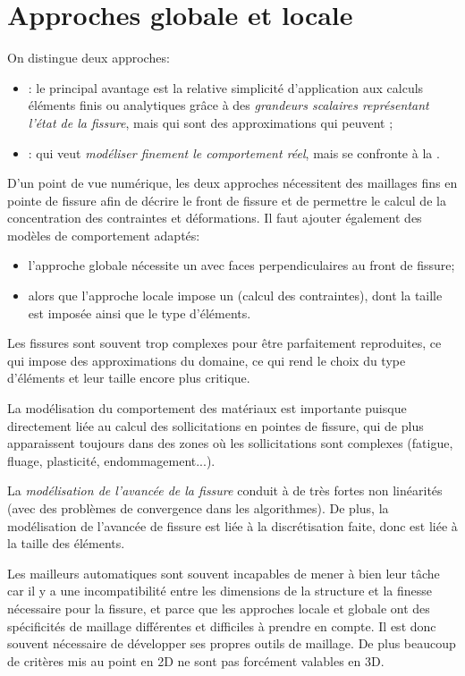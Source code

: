\medskip
\section{Approches globale et locale}
On distingue deux approches:
\begin{itemize}
  \item {}: le principal avantage est la relative simplicité d'application aux calculs éléments finis ou analytiques grâce à des \emph{grandeurs scalaires représentant l'état de la fissure}, mais qui sont des approximations qui peuvent ;
  \item {}: qui veut \emph{modéliser finement le comportement réel}, mais se confronte à la .
\end{itemize}
\medskipvm
D'un point de vue numérique, les deux approches nécessitent des maillages fins en pointe de fissure afin de décrire le front de fissure et de permettre le calcul de la concentration des contraintes et déformations. Il faut ajouter également des modèles de comportement adaptés:
\begin{itemize}
  \item l'approche globale nécessite un  avec faces perpendiculaires au front de fissure;
  \item alors que l'approche locale impose un  (calcul des contraintes), dont la taille est imposée ainsi que le type d'éléments.
\end{itemize}
\medskipvm
Les fissures sont souvent trop complexes pour être parfaitement reproduites, ce qui impose des approximations du domaine, ce qui rend le choix du type d'éléments et leur taille encore plus critique.

La modélisation du comportement des matériaux est importante puisque directement liée au calcul des sollicitations en pointes de fissure, qui de plus apparaissent toujours dans des zones où les sollicitations sont complexes (fatigue, fluage, plasticité, endommagement...).

La \emph{modélisation de l'avancée de la fissure} conduit à de très fortes non linéarités (avec des problèmes de convergence dans les algorithmes). De plus, la modélisation de l'avancée de fissure est liée à la discrétisation faite, donc est liée à la taille des éléments.

Les mailleurs automatiques sont souvent incapables de mener à bien leur tâche car il y a une incompatibilité entre les dimensions de la structure et la finesse nécessaire pour la fissure, et parce que les approches locale et globale ont des spécificités de maillage différentes et difficiles à prendre en compte. Il est donc souvent nécessaire de développer ses propres outils de maillage. De plus beaucoup de critères mis au point en 2D ne sont pas forcément valables en 3D.

